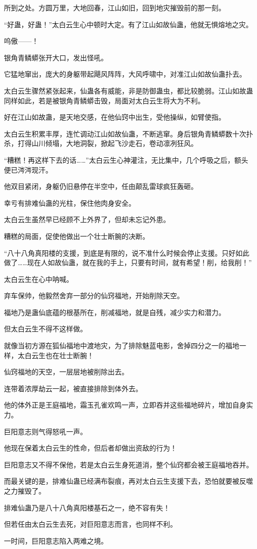 \begin{this_body}
所到之处。方圆万里，大地回春，江山如旧，回到地灾摧毁前的那一刻。

“好蛊，好蛊！”太白云生心中顿时大定。有了江山如故仙蛊，他就无惧熔地之灾。

呜傲——！

银角青鳞蟒张开大口，发出怪吼。

它猛地窜出，庞大的身躯带起飓风阵阵，大风呼啸中，对准江山如故仙蛊扑去。

太白云生骤然紧张起来，仙蛊各有威能，非是防御蛊虫，都比较脆弱。江山如故蛊同样如此，若是被银角青鳞蟒击毁，局面对太白云生将大为不利。

好在江山如故蛊，是天地交感，在他仙窍中出生，受他操纵，如臂使指。

太白云生积累丰厚，连忙调动江山如故仙蛊，不断逃窜。身后银角青鳞蟒数十次扑杀，打得山川倾塌，大地洞裂，掀起飞沙走石，卷动凛冽狂风。

“糟糕！再这样下去的话……”太白云生心神灌注，无比集中，几个呼吸之后，额头便已涔涔现汗。

他双目紧闭，身躯仍旧悬停在半空中，任由颠乱雷球疯狂轰砸。

幸亏有排难仙蛊的光柱，保住他肉身安全。

太白云生虽然早已经顾不上外界了，但却未忘记外患。

糟糕的局面，促使他做出一个壮士断腕的决断。

“八十八角真阳楼的支援，到底是有限的，说不准什么时候会停止支援。只好如此做了……现在人如故仙蛊，就在我的手上，只要有时间，就有希望！削，给我削！”

太白云生在心中呐喊。

弃车保帅，他毅然舍弃一部分的仙窍福地，开始削除天空。

福地乃是蛊仙底蕴的根基所在，削减福地，就是自残，减少实力和潜力。

但太白云生不得不这样做。

就像当初方源在狐仙福地中渡地灾，为了排除魅蓝电影，舍掉四分之一的福地一样，太白云生也在壮士断腕！

仙窍福地的天空，一层层地被削除出去。

连带着浓厚劫云一起，被直接排除到体外去。

他的体外正是王庭福地，霜玉孔雀欢鸣一声，立即吞并这些福地碎片，增加自身实力。

巨阳意志则气得怒吼一声。

他现在保着太白云生的性命，但后者却做出资敌的行为！

巨阳意志又不得不保他，若是太白云生身死道消，整个仙窍都会被王庭福地吞并。

而最关键的是，排难仙蛊已经满布裂痕，再对太白云生支援下去，恐怕就要被反噬之力摧毁了。

排难仙蛊乃是八十八角真阳楼基石之一，绝不容有失！

但若任由太白云生去死，对巨阳意志而言，也同样不利。

一时间，巨阳意志陷入两难之境。

\end{this_body}

